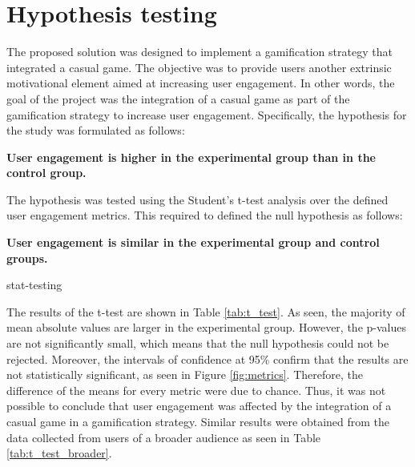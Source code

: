 \section{Hypothesis testing}
The proposed solution was designed to implement a gamification strategy that integrated a casual game. The objective was to provide users another extrinsic motivational element aimed at increasing user engagement. In other words, the goal of the project was the integration of a casual game as part of the gamification strategy to increase user engagement. Specifically, the hypothesis for the study was formulated as follows:

\begin{displayquote}
\textbf{User engagement is higher in the experimental group than in the control group.}
\end{displayquote}

The hypothesis was tested using the Student's t-test analysis over the defined user engagement metrics. This required to defined the null hypothesis as follows:

\begin{displayquote}
\textbf{User engagement is similar in the experimental group and control groups.}
\end{displayquote}

stat-testing

The results of the t-test are shown in Table \ref{tab:t_test}. As seen, the majority of mean absolute values are larger in the experimental group. However, the p-values are not significantly small, which means that the null hypothesis could not be rejected. Moreover, the intervals of confidence at 95\% confirm that the results are not statistically significant, as seen in Figure \ref{fig:metrics}. Therefore, the difference of the means for every metric were due to chance. Thus, it was not possible to conclude that user engagement was affected by the integration of a casual game in a gamification strategy. Similar results were obtained from the data collected from users of a broader audience as seen in Table \ref{tab:t_test_broader}.

